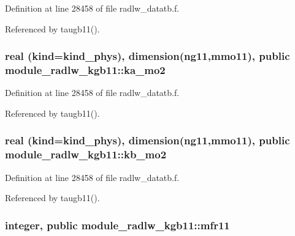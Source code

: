 Definition at line 28458 of file radlw\+\_\+datatb.\+f.



Referenced by taugb11().

\subsubsection[{\texorpdfstring{ka\+\_\+mo2}{ka_mo2}}]{\setlength{\rightskip}{0pt plus 5cm}real (kind=kind\+\_\+phys), dimension(ng11,{\bf mmo11}), public module\+\_\+radlw\+\_\+kgb11\+::ka\+\_\+mo2}\hypertarget{namespacemodule__radlw__kgb11_a8791eb290525c0d08fefa33ca23569c8}{}\label{namespacemodule__radlw__kgb11_a8791eb290525c0d08fefa33ca23569c8}


Definition at line 28458 of file radlw\+\_\+datatb.\+f.



Referenced by taugb11().

\subsubsection[{\texorpdfstring{kb\+\_\+mo2}{kb_mo2}}]{\setlength{\rightskip}{0pt plus 5cm}real (kind=kind\+\_\+phys), dimension(ng11,{\bf mmo11}), public module\+\_\+radlw\+\_\+kgb11\+::kb\+\_\+mo2}\hypertarget{namespacemodule__radlw__kgb11_aebc48e152bb90794b6d0b426f6c5f9e4}{}\label{namespacemodule__radlw__kgb11_aebc48e152bb90794b6d0b426f6c5f9e4}


Definition at line 28458 of file radlw\+\_\+datatb.\+f.



Referenced by taugb11().

\subsubsection[{\texorpdfstring{mfr11}{mfr11}}]{\setlength{\rightskip}{0pt plus 5cm}integer, public module\+\_\+radlw\+\_\+kgb11\+::mfr11}\hypertarget{namespacemodule__radlw__kgb11_a9b5764441999cce52bc02e65a24420b9}{}\label{namespacemodule__radlw__kgb11_a9b5764441999cce52bc02e65a24420b9}


